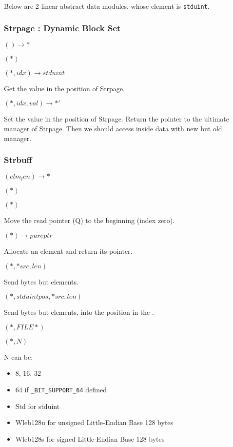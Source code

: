 
Below are 2 linear abstract data modules, whose element is \verb|stduint|.

\subsubsection{Strpage : Dynamic Block Set}

$() \rightarrow *$

$(*)$

$(*, idx) \rightarrow stduint$

Get the value in the position of Strpage.

$(*, idx, val) \rightarrow *'$

Set the value in the position of Strpage.
Return the pointer to the ultimate manager of Strpage.
Then we should access inside data with new but old manager.

\subsubsection{Strbuff}

$(elm_len) \rightarrow *$

$(*)$

$(*)$

Move the read pointer (Q) to the beginning (index zero).

$(*) \rightarrow pureptr$

Allocate an element and return its pointer.

$(*, *src, len)$

Send bytes but elements.

$(*, stduint pos, *src, len)$

Send bytes but elements, into the position in the .

$(*, FILE*)$

$(*, {N})$

N can be:
\begin{itemize}
\item 8, 16, 32
\item 64 if \verb`_BIT_SUPPORT_64` defined
\item Std for stduint
\item Wleb128u for unsigned Little-Endian Base 128 bytes
\item Wleb128s for   signed Little-Endian Base 128 bytes
\end{itemize}

